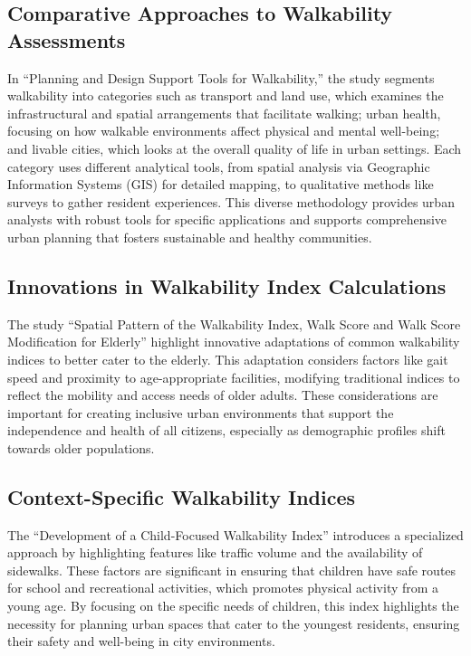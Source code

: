 \documentclass[
]{article}
\begin{document}
\subsection{Comparative Approaches to Walkability
Assessments}\label{comparative-approaches-to-walkability-assessments}

In ``Planning and Design Support Tools for Walkability,'' the study
segments walkability into categories such as transport and land use,
which examines the infrastructural and spatial arrangements that
facilitate walking; urban health, focusing on how walkable environments
affect physical and mental well-being; and livable cities, which looks
at the overall quality of life in urban settings. Each category uses
different analytical tools, from spatial analysis via Geographic
Information Systems (GIS) for detailed mapping, to qualitative methods
like surveys to gather resident experiences. This diverse methodology
provides urban analysts with robust tools for specific applications and
supports comprehensive urban planning that fosters sustainable and
healthy communities.

\subsection{Innovations in Walkability Index
Calculations}\label{innovations-in-walkability-index-calculations}

The study ``Spatial Pattern of the Walkability Index, Walk Score and
Walk Score Modification for Elderly'' highlight innovative adaptations
of common walkability indices to better cater to the elderly. This
adaptation considers factors like gait speed and proximity to
age-appropriate facilities, modifying traditional indices to reflect the
mobility and access needs of older adults. These considerations are
important for creating inclusive urban environments that support the
independence and health of all citizens, especially as demographic
profiles shift towards older populations.

\subsection{Context-Specific Walkability
Indices}\label{context-specific-walkability-indices}

The ``Development of a Child-Focused Walkability Index'' introduces a
specialized approach by highlighting features like traffic volume and
the availability of sidewalks. These factors are significant in ensuring
that children have safe routes for school and recreational activities,
which promotes physical activity from a young age. By focusing on the
specific needs of children, this index highlights the necessity for
planning urban spaces that cater to the youngest residents, ensuring
their safety and well-being in city environments.
\end{document}
